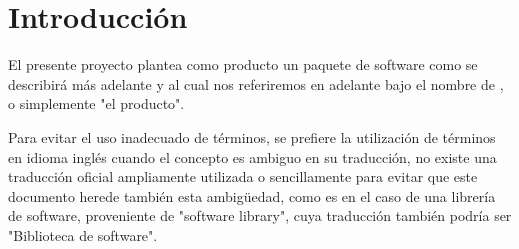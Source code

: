 \section{Introducción}

El presente proyecto plantea como producto un paquete de software como se describirá más adelante y al cual nos referiremos en adelante bajo el nombre de , o simplemente "el producto".

Para evitar el uso inadecuado de términos, se prefiere la utilización de
términos en idioma inglés cuando el concepto es ambiguo en su traducción, no
existe una traducción oficial ampliamente utilizada o sencillamente para evitar
que este documento herede también esta ambigüedad, como es en el caso de una
librería de software, proveniente de "software library", cuya traducción también
podría ser "Biblioteca de software".